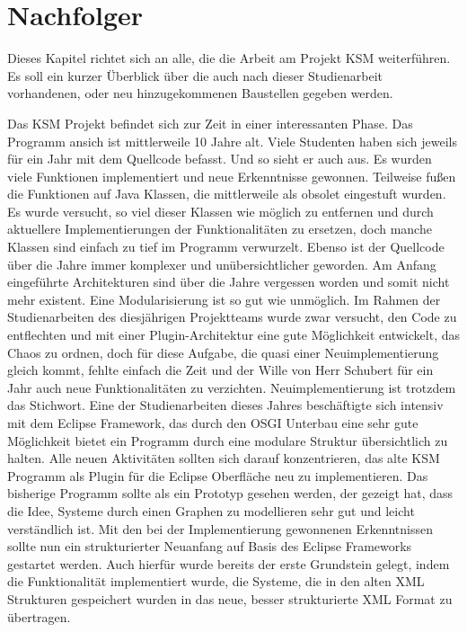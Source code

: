 \section{Nachfolger}

Dieses Kapitel richtet sich an alle, die die Arbeit am Projekt KSM weiterführen. Es soll ein kurzer Überblick über die auch nach dieser Studienarbeit vorhandenen, oder neu hinzugekommenen Baustellen gegeben werden. 

Das KSM Projekt befindet sich zur Zeit in einer interessanten Phase. Das Programm ansich ist mittlerweile 10 Jahre alt. Viele Studenten haben sich jeweils für ein Jahr mit dem Quellcode befasst. Und so sieht er auch aus. Es wurden viele Funktionen implementiert und neue Erkenntnisse gewonnen. Teilweise fußen die Funktionen auf Java Klassen, die mittlerweile als obsolet eingestuft wurden. Es wurde versucht, so viel dieser Klassen wie möglich zu entfernen und durch aktuellere Implementierungen der Funktionalitäten zu ersetzen, doch manche Klassen sind einfach zu tief im Programm verwurzelt. Ebenso ist der Quellcode über die Jahre immer komplexer und unübersichtlicher geworden. Am Anfang eingeführte Architekturen sind über die Jahre vergessen worden und somit nicht mehr existent. Eine Modularisierung ist so gut wie unmöglich. Im Rahmen der Studienarbeiten des diesjährigen Projektteams wurde zwar versucht, den Code zu entflechten und mit einer Plugin-Architektur eine gute Möglichkeit entwickelt, das Chaos zu ordnen, doch für diese Aufgabe, die quasi einer Neuimplementierung gleich kommt, fehlte einfach die Zeit und der Wille von Herr Schubert für ein Jahr auch neue Funktionalitäten zu verzichten. Neuimplementierung ist trotzdem das Stichwort. Eine der Studienarbeiten dieses Jahres beschäftigte sich intensiv mit dem Eclipse Framework, das durch den OSGI Unterbau eine sehr gute Möglichkeit bietet ein Programm durch eine modulare Struktur übersichtlich zu halten. Alle neuen Aktivitäten sollten sich darauf konzentrieren, das alte KSM Programm als Plugin für die Eclipse Oberfläche neu zu implementieren. Das bisherige Programm sollte als ein Prototyp gesehen werden, der gezeigt hat, dass die Idee, Systeme durch einen Graphen zu modellieren sehr gut und leicht verständlich ist. Mit den bei der Implementierung gewonnenen Erkenntnissen sollte nun ein strukturierter Neuanfang auf Basis des Eclipse Frameworks gestartet werden. Auch hierfür wurde bereits der erste Grundstein gelegt, indem die Funktionalität implementiert wurde, die Systeme, die in den alten XML Strukturen gespeichert wurden in das neue, besser strukturierte XML Format zu übertragen.

